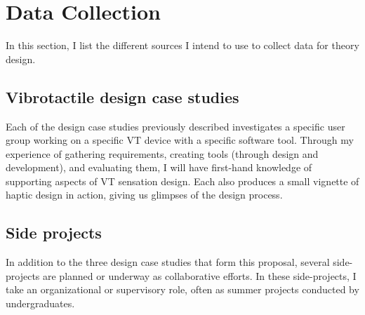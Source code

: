 %
%
\section{Data Collection}
In this section, I list the different sources I intend to use to collect data for theory design.

\subsection{Vibrotactile design case studies}
Each of the  design case studies previously described investigates a specific user group working on a specific VT device with a specific software tool.
Through my experience of gathering requirements, creating tools (through design and development), and evaluating them, I will have first-hand knowledge of supporting aspects of VT sensation design.
Each also produces a small vignette of haptic design in action, giving us glimpses of the design process.

\subsection{Side projects}
In addition to the three design case studies that form this proposal, several side-projects are planned or underway as collaborative efforts.
In these side-projects, I take an organizational or supervisory role, often as summer projects conducted by undergraduates.

